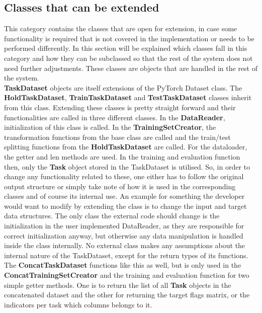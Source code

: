 \subsection{Classes that can be extended}

This category contains the classes that are open for extension, in case some functionality is required that is not covered in the implementation or needs to be performed differently. In this section will be explained which classes fall in this category and how they can be subclassed so that the rest of the system does not need further adjustments. These classes are objects that are handled in the rest of the system. \\

\textbf{TaskDataset} objects are itself extensions of the PyTorch Dataset class. The \textbf{HoldTaskDataset}, \textbf{TrainTaskDataset} and \textbf{TestTaskDataset} classes inherit from this class. Extending these classes is pretty straight forward and their functionalities are called in three different classes. In the \textbf{DataReader}, initialization of this class is called. In the \textbf{TrainingSetCreator}, the transformation functions from the base class are called and the train/test splitting functions from the \textbf{HoldTaskDataset} are called. For the dataloader, the getter and len methods are used. In the training and evaluation function then, only the \textbf{Task} object stored in the TaskDataset is utilised. So, in order to change any functionality related to these, one either has to follow the original output structure or simply take note of how it is used in the corresponding classes and of course its internal use. An example for something the developer would want to modify by extending the class is to change the input and target data structures. The only class the external code should change is the initialization in the user implemented DataReader, as they are responsible for correct initialization anyway, but otherwise any data manipulation is handled inside the class internally. No external class makes any assumptions about the internal nature of the TaskDataset, except for the return types of its functions.\\

The \textbf{ConcatTaskDataset} functions like this as well, but is only used in the \textbf{ConcatTrainingSetCreator} and the training and evaluation function for two simple getter methods. One is to return the list of all \textbf{Task} objects in the concatenated dataset and the other for returning the target flags matrix, or the indicators per task which columns belongs to it. \\


